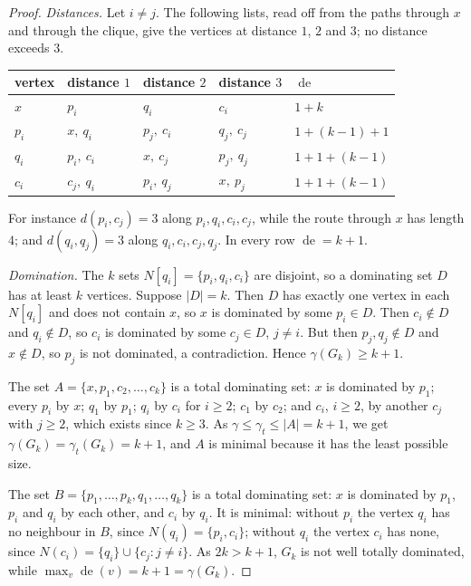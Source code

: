 \documentclass[11pt]{amsart}
\theoremstyle{definition}
\theoremstyle{remark}
\numberwithin{equation}{section}
\newcommand{\gt}{\gamma_t}
\newcommand{\de}{\operatorname{de}}
\begin{document}
\begin{proof}
\emph{Distances.} Let $i\neq j$. The following lists, read off from the paths through $x$ and through the clique, give the vertices at distance $1$, $2$ and $3$; no distance exceeds $3$.
\begin{center}
\begin{tabular}{lllll}
\toprule
vertex & distance $1$ & distance $2$ & distance $3$ & $\de$\\
\midrule
$x$ & $p_i$ & $q_i$ & $c_i$ & $1+k$\\
$p_i$ & $x,\ q_i$ & $p_j,\ c_i$ & $q_j,\ c_j$ & $1+(k-1)+1$\\
$q_i$ & $p_i,\ c_i$ & $x,\ c_j$ & $p_j,\ q_j$ & $1+1+(k-1)$\\
$c_i$ & $c_j,\ q_i$ & $p_i,\ q_j$ & $x,\ p_j$ & $1+1+(k-1)$\\
\bottomrule
\end{tabular}
\end{center}
For instance $d(p_i,c_j)=3$ along $p_i,q_i,c_i,c_j$, while the route through $x$ has length $4$; and $d(q_i,q_j)=3$ along $q_i,c_i,c_j,q_j$. In every row $\de=k+1$.

\emph{Domination.} The $k$ sets $N[q_i]=\{p_i,q_i,c_i\}$ are disjoint, so a dominating set $D$ has at least $k$ vertices. Suppose $|D|=k$. Then $D$ has exactly one vertex in each $N[q_i]$ and does not contain $x$, so $x$ is dominated by some $p_i\in D$. Then $c_i\notin D$ and $q_i\notin D$, so $c_i$ is dominated by some $c_j\in D$, $j\neq i$. But then $p_j,q_j\notin D$ and $x\notin D$, so $p_j$ is not dominated, a contradiction. Hence $\gamma(G_k)\ge k+1$.

The set $A=\{x,p_1,c_2,\dots,c_k\}$ is a total dominating set: $x$ is dominated by $p_1$; every $p_i$ by $x$; $q_1$ by $p_1$; $q_i$ by $c_i$ for $i\ge2$; $c_1$ by $c_2$; and $c_i$, $i\ge2$, by another $c_j$ with $j\ge2$, which exists since $k\ge3$. As $\gamma\le\gt\le|A|=k+1$, we get $\gamma(G_k)=\gt(G_k)=k+1$, and $A$ is minimal because it has the least possible size.

The set $B=\{p_1,\dots,p_k,q_1,\dots,q_k\}$ is a total dominating set: $x$ is dominated by $p_1$, $p_i$ and $q_i$ by each other, and $c_i$ by $q_i$. It is minimal: without $p_i$ the vertex $q_i$ has no neighbour in $B$, since $N(q_i)=\{p_i,c_i\}$; without $q_i$ the vertex $c_i$ has none, since $N(c_i)=\{q_i\}\cup\{c_j:j\neq i\}$. As $2k>k+1$, $G_k$ is not well totally dominated, while $\max_v\de(v)=k+1=\gamma(G_k)$.
\end{proof}
\end{document}
